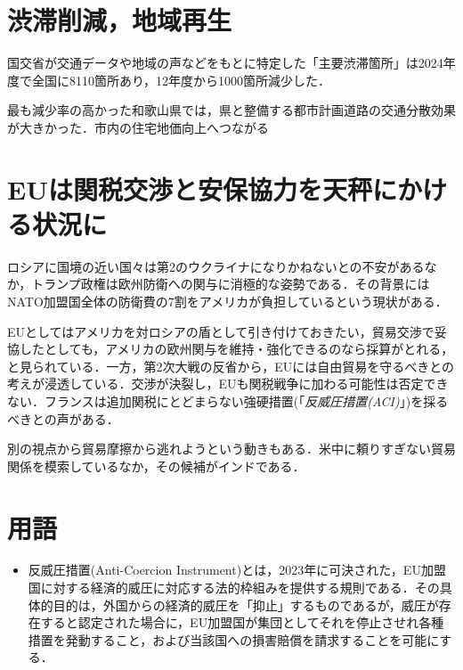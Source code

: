 \documentclass{ltjsarticle}
\begin{document}
\section{渋滞削減，地域再生}

国交省が交通データや地域の声などをもとに特定した「主要渋滞箇所」は2024年度で全国に8110箇所あり，12年度から1000箇所減少した．

最も減少率の高かった和歌山県では，県と整備する都市計画道路の交通分散効果が大きかった．市内の住宅地価向上へつながる


\section{EUは関税交渉と安保協力を天秤にかける状況に}

ロシアに国境の近い国々は第2のウクライナになりかねないとの不安があるなか，トランプ政権は欧州防衛への関与に消極的な姿勢である．その背景にはNATO加盟国全体の防衛費の7割をアメリカが負担しているという現状がある．

EUとしてはアメリカを対ロシアの盾として引き付けておきたい，貿易交渉で妥協したとしても，アメリカの欧州関与を維持・強化できるのなら採算がとれる，と見られている．一方，第2次大戦の反省から，EUには自由貿易を守るべきとの考えが浸透している．交渉が決裂し，EUも関税戦争に加わる可能性は否定できない．フランスは追加関税にとどまらない強硬措置(「\emph{反威圧措置(ACI)}」)を採るべきとの声がある．

別の視点から貿易摩擦から逃れようという動きもある．米中に頼りすぎない貿易関係を模索しているなか，その候補がインドである．


\section{用語}

\begin{itemize}
  \item 反威圧措置(Anti-Coercion Instrument)とは，2023年に可決された，EU加盟国に対する経済的威圧に対応する法的枠組みを提供する規則である．その具体的目的は，外国からの経済的威圧を「抑止」するものであるが，威圧が存在すると認定された場合に，EU加盟国が集団としてそれを停止させれ各種措置を発動すること，および当該国への損害賠償を請求することを可能にする．
\end{itemize}
\end{document}
